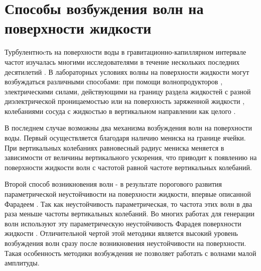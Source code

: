 
\section{Способы возбуждения волн на поверхности жидкости}\label{p1_methodsExt}

Турбулентноcть на поверхности воды в гравитационно-капиллярном интервале частот изучалась многими исследователями в течение нескольких последних десятилетий \cite{Falcon2007, Henry2000, Shats2010, Denissenko2007}. В лабораторных условиях волны на поверхности жидкости могут возбуждаться различными способами: при помощи волнопродукторов \cite{Havelock1929, Falcon2007}, электрическими силами, действующими на границу раздела жидкостей с разной диэлектрической проницаемостью \cite{Kalinichenko1982} или на поверхность заряженной жидкости \cite{Brazhnikov2002}, колебаниями сосуда с жидкостью в вертикальном направлении как целого \cite{Miles1990}.

В последнем случае возможны два механизма возбуждения волн на поверхности воды. Первый осуществляется благодаря наличию мениска на границе ячейки. При вертикальных колебаниях равновесный радиус мениска меняется в зависимости от величины вертикального ускорения, что приводит к появлению на поверхности жидкости волн с частотой равной частоте вертикальных колебаний. 

Второй способ возникновения волн - в результате порогового развития параметрической неустойчивости на поверхности жидкости, впервые описанной Фарадеем \cite{Faraday1831}. Так как неустойчивость параметрическая, то частота этих волн в два раза меньше частоты вертикальных колебаний. Во многих работах для генерации волн используют эту параметрическую неустойчивость Фарадея поверхности жидкости \cite{Henry2000, Shats2010, Denissenko2007}. Отличительной чертой этой методики является высокий уровень возбуждения волн сразу после возникновения неустойчивости на поверхности. Такая особенность методики возбуждения не позволяет работать с волнами малой амплитуды.

